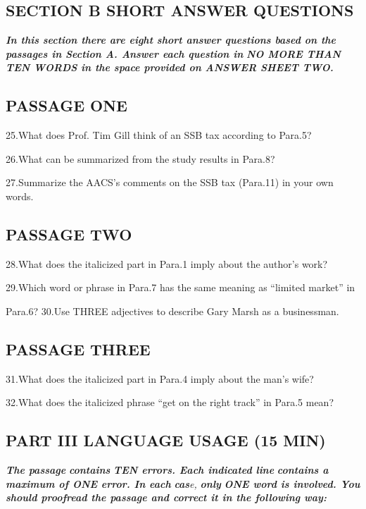 \documentclass[UTF8,11pt]{ctexart}
\begin{document}
\subsection*{\textbf{SECTION B SHORT ANSWER QUESTIONS}}


\textbf{\textit{In this section there are eight short answer questions based on the passages in Section A. Answer each question in}} \textbf{\textit{NO MORE THAN TEN WORDS in the space provided on ANSWER SHEET TWO.}}


\subsection*{\textbf{PASSAGE ONE}}


25.What does Prof. Tim Gill think of an SSB tax according to Para.5?


26.What can be summarized from the study results in Para.8?


27.Summarize the AACS’s comments on the SSB tax (Para.11) in your own words.


\subsection*{\textbf{PASSAGE TWO}}


28.What does the italicized part in Para.1 imply about the author’s work?


29.Which word or phrase in Para.7 has the same meaning as “limited market” in


Para.6? 30.Use THREE adjectives to describe Gary Marsh as a businessman.


\subsection*{\textbf{PASSAGE THREE}}


31.What does the italicized part in Para.4 imply about the man’s wife?


32.What does the italicized phrase “get on the right track” in Para.5 mean?


\subsection*{\textbf{PART III LANGUAGE USAGE (15 MIN)}}


\textbf{\textit{The passage}} \textbf{\textit{contains}} \textbf{\textit{TEN errors. Each indicated line}} \textbf{\textit{contains a maximum of ONE error. In each}} \textbf{\textit{cas}}\textit{e, }\textbf{\textit{only}} \textbf{\textit{ONE word is involved. You should proofread the passage and correct it in the following way:}}
\end{document}
